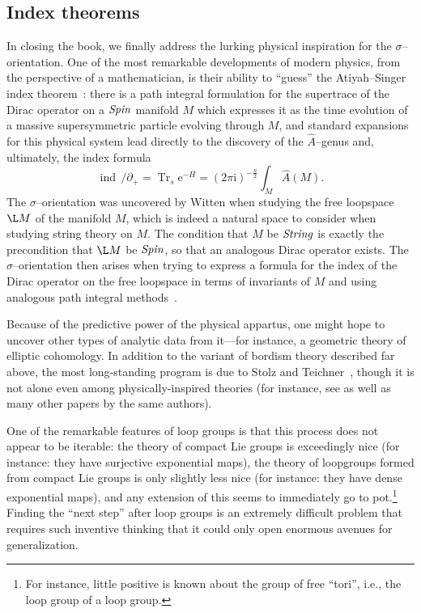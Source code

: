 \subsection*{Index theorems}

In closing the book, we finally address the lurking physical inspiration for the \(\sigma\)--orientation.  One of the most remarkable developments of modern physics, from the perspective of a mathematician, is their ability to ``guess'' the Atiyah--Singer index theorem~\cite[Section 8.6]{Takhtajan}: there is a path integral formulation for the supertrace of the Dirac operator on a \(\mathit{Spin}\) manifold \(M\) which expresses it as the time evolution of a massive supersymmetric particle evolving through \(M\), and standard expansions for this physical system lead directly to the discovery of the \(\widehat A\)--genus and, ultimately, the index formula \[\operatorname{ind}\, /\!\!\!\partial_+ = \operatorname{Tr}_s \mathrm e^{-H} = (2 \pi \mathrm i)^{-\frac{n}{2}} \int_M \widehat A(M).\]  The \(\sigma\)--orientation was uncovered by Witten when studying the free loopspace \(\L M\) of the manifold \(M\), which is indeed a natural space to consider when studying string theory on \(M\).  The condition that \(M\) be \(\mathit{String}\) is exactly the precondition that \(\L M\) be \(\mathit{Spin}\), so that an analogous Dirac operator exists.  The \(\sigma\)--orientation then arises when trying to express a formula for the index of the Dirac operator on the free loopspace in terms of invariants of \(M\) and using analogous path integral methods~\cite{SegalEll}.

Because of the predictive power of the physical appartus, one might hope to uncover other types of analytic data from it---for instance, a geometric theory of elliptic cohomology.  In addition to the variant of bordism theory described far above, the most long-standing program is due to Stolz and Teichner~\cite{StolzTeichnerWhatIs,StolzTeichnerSusy}, though it is not alone even among physically-inspired theories (for instance, see \cite{DouglasHenriques} as well as many other papers by the same authors).

One of the remarkable features of loop groups is that this process does not appear to be iterable: the theory of compact Lie groups is exceedingly nice (for instance: they have surjective exponential maps), the theory of loopgroups formed from compact Lie groups is only slightly less nice (for instance: they have dense exponential maps), and any extension of this seems to immediately go to pot.\footnote{For instance, little positive is known about the group of free ``tori'', i.e., the loop group of a loop group.}  Finding the ``next step'' after loop groups is an extremely difficult problem that requires such inventive thinking that it could only open enormous avenues for generalization.








